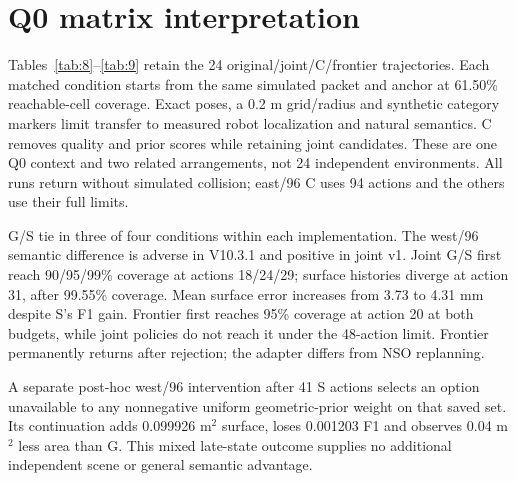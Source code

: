\section{Q0 matrix interpretation}

Tables~\ref{tab:8}--\ref{tab:9} retain the 24 original/joint/C/frontier trajectories. Each matched condition starts from the same simulated packet and anchor at 61.50\% reachable-cell coverage. Exact poses, a 0.2 m grid/radius and synthetic category markers limit transfer to measured robot localization and natural semantics. C removes quality and prior scores while retaining joint candidates. These are one Q0 context and two related arrangements, not 24 independent environments. All runs return without simulated collision; east/96 C uses 94 actions and the others use their full limits.

G/S tie in three of four conditions within each implementation. The west/96 semantic difference is adverse in V10.3.1 and positive in joint v1. Joint G/S first reach 90/95/99\% coverage at actions 18/24/29; surface histories diverge at action 31, after 99.55\% coverage. Mean surface error increases from 3.73 to 4.31 mm despite S's F1 gain. Frontier first reaches 95\% coverage at action 20 at both budgets, while joint policies do not reach it under the 48-action limit. Frontier permanently returns after rejection; the adapter differs from NSO replanning.

A separate post-hoc west/96 intervention after 41 S actions selects an option unavailable to any nonnegative uniform geometric-prior weight on that saved set. Its continuation adds 0.099926 m$^2$ surface, loses 0.001203 F1 and observes 0.04 m$^2$ less area than G. This mixed late-state outcome supplies no additional independent scene or general semantic advantage.
